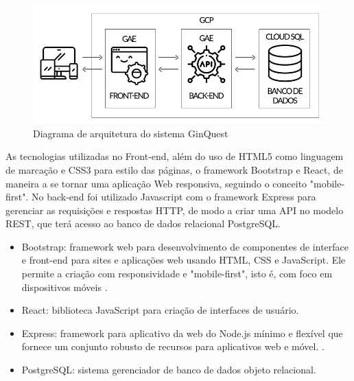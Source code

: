 \documentclass[
    12pt,               %
    openright,          %
    twoside,            %
    a4paper,            %
    openany             %
    draft,              %
    MODELO,             %
    TODO,               %
    english,            %
    brazil              %
    ]{ifsp-spo-inf-ctds}
\begin{document}
\begin{figure}
\caption{Diagrama de arquitetura do sistema GinQuest}
\begin{center}
\includegraphics[scale=0.5]{images/poc/poc_arquitetura.jpg}
\end{center}
\label{fig:arquitetura}
\end{figure}


As tecnologias utilizadas no Front-end, além do uso de HTML5 como linguagem de marcação e CSS3 para estilo das páginas, o framework Bootstrap e React, de maneira a se tornar uma aplicação Web responsiva, seguindo o conceito "mobile-first". No back-end foi utilizado Javascript com o framework Express para gerenciar as requisições e respostas HTTP, de modo a criar uma API no modelo REST, que terá acesso ao banco de dados relacional PostgreSQL.

\begin{itemize}

\item Bootstrap: framework web para desenvolvimento de componentes de interface e front-end para sites e aplicações web usando HTML, CSS e JavaScript. Ele permite a criação com responsividade e "mobile-first", isto é, com foco em dispositivos móveis \cite{bootstrap}. 
\item React: biblioteca JavaScript para criação de interfaces de usuário.
\item Express: framework para aplicativo da web do Node.js mínimo e flexível que fornece um conjunto robusto de recursos para aplicativos web e móvel. \cite{express}.
\item PostgreSQL: sistema gerenciador de banco de dados objeto relacional.
\end{itemize}
\end{document}
